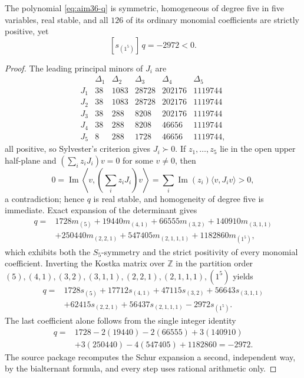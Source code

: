 \begin{theorem}\label{thm:aim36}
The polynomial \eqref{eq:aim36-q} is symmetric, homogeneous of degree five in five variables, real stable, and all $126$ of its ordinary monomial coefficients are strictly positive, yet
\[
[s_{(1^5)}]\,q=-2972<0.
\]
\end{theorem}
\begin{proof}
The leading principal minors of $J_i$ are
\[
\begin{array}{c|rrrrr}
 &\Delta_1&\Delta_2&\Delta_3&\Delta_4&\Delta_5\\ \hline
J_1&38&1083&28728&202176&1119744\\
J_2&38&1083&28728&202176&1119744\\
J_3&38&288&8208&202176&1119744\\
J_4&38&288&8208&46656&1119744\\
J_5&8&288&1728&46656&1119744,
\end{array}
\]
all positive, so Sylvester's criterion gives $J_i\succ0$.  If $z_1,\ldots,z_5$ lie in the open upper half-plane and $(\sum_iz_iJ_i)v=0$ for some $v\ne0$, then
\[
0=\operatorname{Im}\left\langle v,\left(\textstyle\sum_iz_iJ_i\right)v\right\rangle=\sum_i\operatorname{Im}(z_i)\langle v,J_iv\rangle>0,
\]
a contradiction; hence $q$ is real stable, and homogeneity of degree five is immediate.  Exact expansion of the determinant gives
\begin{align*}
q={}&1728m_{(5)}+19440m_{(4,1)}+66555m_{(3,2)}+140910m_{(3,1,1)}\\
&+250440m_{(2,2,1)}+547405m_{(2,1,1,1)}+1182860m_{(1^5)},
\end{align*}
which exhibits both the $S_5$-symmetry and the strict positivity of every monomial coefficient.  Inverting the Kostka matrix over $\mathbb Z$ in the partition order $(5),(4,1),(3,2),(3,1,1),(2,2,1),(2,1,1,1),(1^5)$ yields
\begin{align*}
q={}&1728s_{(5)}+17712s_{(4,1)}+47115s_{(3,2)}+56643s_{(3,1,1)}\\
&+62415s_{(2,2,1)}+56437s_{(2,1,1,1)}-2972s_{(1^5)}.
\end{align*}
The last coefficient alone follows from the single integer identity
\begin{align*}
[s_{(1^5)}]q={}&1728-2(19440)-2(66555)+3(140910)\\
&+3(250440)-4(547405)+1182860=-2972.
\end{align*}
The source package recomputes the Schur expansion a second, independent way, by the bialternant formula, and every step uses rational arithmetic only.
\end{proof}

